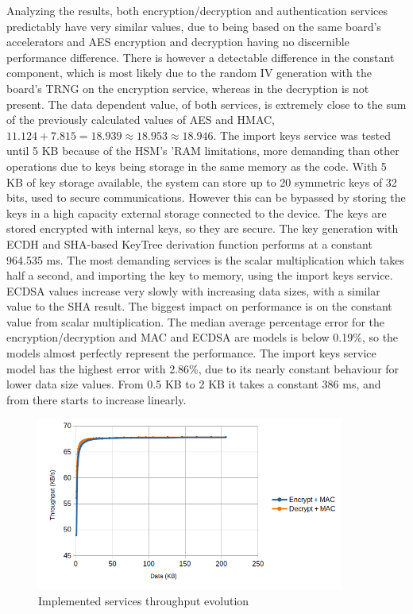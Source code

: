 Analyzing the results, both encryption/decryption and authentication services predictably have very similar values, due to being based on the same board's accelerators and \ac{AES} encryption and decryption having no discernible performance difference.
There is however a detectable difference in the constant component, which is most likely due to the random \ac{IV} generation with the board's \ac{TRNG} on the encryption service, whereas in the decryption is not present.
The data dependent value, of both services, is extremely close to the sum of the previously calculated values of \ac{AES} and \ac{HMAC}, \(11.124+7.815=18.939\approx18.953\approx18.946\).
The import keys service was tested until 5 KB because of the \ac{HSM}'s '\ac{RAM} limitations, more demanding than other operations due to keys being storage in the same memory as the code. With 5 KB of key storage available, the system can store up to 20 symmetric keys of 32 bits, used to secure communications. However this can be bypassed by storing the keys in a high capacity external storage connected to the device. The keys are stored encrypted with internal keys, so they are secure.
The key generation with \ac{ECDH} and \ac{SHA}-based KeyTree derivation function performs at a constant 964.535 ms. The most demanding services is the scalar multiplication which takes half a second, and importing the key to memory, using the import keys service.
\ac{ECDSA} values increase very slowly with increasing data sizes, with a similar value to the \ac{SHA} result. The biggest impact on performance is on the constant value from scalar multiplication.
The median average percentage error for the encryption/decryption and MAC and \ac{ECDSA} are models is below 0.19\%, so the models almost perfectly represent the performance. The import keys service model has the highest error with 2.86\%, due to its nearly constant behaviour for lower data size values. From 0.5 KB to 2 KB it takes a constant 386 ms, and from there starts to increase linearly.

\begin{figure}[h!]
	\centering
	\includegraphics[width=0.9\textwidth]{./Images/services-tput.png}
	\caption{Implemented services throughput evolution}
	\label{fig:performance:services-tput}
\end{figure}

